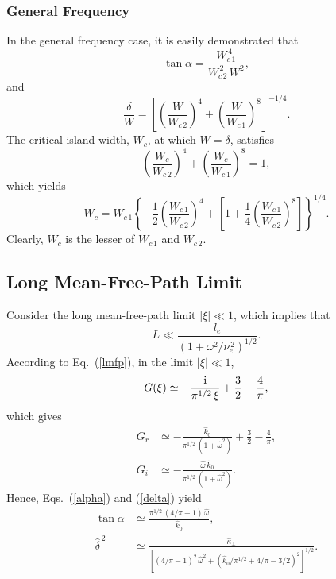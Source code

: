 \documentclass[12pt,prb,aps]{revtex4-1}
\begin{document}
\subsubsection{General Frequency}
In the general frequency case, it is easily demonstrated that
\begin{equation}
\tan\alpha  = \frac{W_{c\,1}^{\,4}}{W_{c\,2}^{\,2}\,W^2},
\end{equation}
and
\begin{equation}
\frac{\delta}{W} = \left[\left(\frac{W}{W_{c\,2}}\right)^4 + \left(\frac{W}{W_{c\,1}}\right)^8\right]^{-1/4}.
\end{equation}
The critical island width, $W_c$,  at which $W=\delta$, satisfies
\begin{equation}
\left(\frac{W_c}{W_{c\,2}}\right)^4 + \left(\frac{W_c}{W_{c\,1}}\right)^8= 1,
\end{equation}
which yields 
\begin{equation}
W_c= W_{c\,1}\left\{-\frac{1}{2}
\left(\frac{W_{c\,1}}{W_{c\,2}}\right)^4
+\left[1+\frac{1}{4}\left(\frac{W_{c\,1}}{W_{c\,2}}\right)^8\right]
\right\}^{1/4}.
\end{equation}
Clearly, $W_c$ is the lesser of $W_{c\,1}$ and $W_{c\,2}$. 

\subsection{Long Mean-Free-Path Limit}
Consider the long mean-free-path limit 
 $|\xi|\ll 1$, which implies that
\begin{equation}
L\ll \frac{l_e}{(1+\omega^2/\nu_e^{\,2})^{1/2}}.
\end{equation}
According to Eq.~(\ref{lmfp}), in the limit $|\xi|\ll 1$, 
\begin{equation}
G(\xi) \simeq -\frac{{\rm i}}{\pi^{1/2}\,\xi} + \frac{3}{2}-\frac{4}{\pi},
\end{equation}
which gives
\begin{align}
G_r&\simeq -\frac{\hat{k}_0}{\pi^{1/2}\,(1+\hat{\omega}^2)}+\frac{3}{2}-\frac{4}{\pi},\\[0.5ex]
G_i &\simeq -\frac{\hat{\omega}\,\hat{k}_0}{\pi^{1/2}\,(1+\hat{\omega}^2)}.
\end{align}
Hence, Eqs.~(\ref{alpha}) and (\ref{delta}) yield
\begin{align}\label{e135}
\tan\alpha&\simeq \frac{\pi^{1/2}\,(4/\pi-1)\,\hat{\omega}}{\hat{k}_0},\\[0.5ex]
\hat{\delta}^{\,2}&\simeq \frac{\hat{\kappa}_\perp}{[(4/\pi-1)^2\,\hat{\omega}^2 + (\hat{k}_0/\pi^{1/2}+4/\pi-3/2)^2]^{1/2}}.\label{e136}
\end{align}
\end{document}
